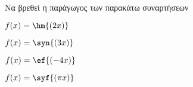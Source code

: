 Να βρεθεί η παράγωγος των παρακάτω συναρτήσεων
\begin{alist}
\item $ f(x)=\hm{(2x)} $
\item $ f(x)=\syn{(3x)} $
\item $ f(x)=\ef{(-4x)} $
\item $ f(x)=\syf{(\pi x)} $
\end{alist}
